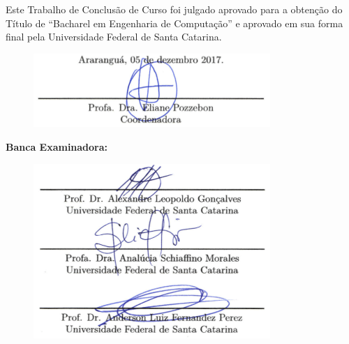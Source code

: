 \begin{titlepage}
	\vfill
	\begin{center}
		\ABNTautordata \\[1cm]
		
		\tituloformat{\ABNTtitulodata} 
		\tituloformat{\subtitulodata} \\
		
		\vspace{1,5cm}
	
	    \begin{minipage}{\textwidth}
 			\begin{espacosimples}
				
                \textnormal{\hspace{1cm} Este Trabalho de Conclusão de Curso foi julgado aprovado para a obtenção do Título de ``Bacharel em Engenharia de Computação'' e aprovado em sua forma final pela Universidade Federal de Santa Catarina.}
 			\end{espacosimples}
 		\end{minipage}
			
		\begin{figure}[H]
		    \centering
		    \includegraphics[width=0.8\textwidth]{pretextual/FichaDeAprovacao_Data_Coord.png}
		\end{figure}	
		\begin{flushleft}
		
    	\textnormal{\bf Banca Examinadora:}
    	
		\end{flushleft}
		\begin{figure}[H]
		    \centering
		    \includegraphics[width=0.8\textwidth]{pretextual/FichaDeAprovacao_Banca.png}
		\end{figure}	
	\end{center}
	\vspace{1cm}
\end{titlepage}

\begin{titlepage}
    
\end{titlepage}
